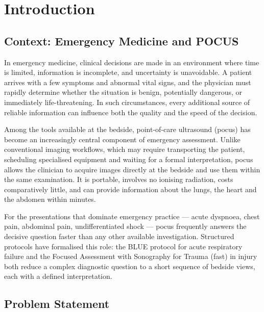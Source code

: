 \section{Introduction}
\label{sec:introduction}

\subsection{Context: Emergency Medicine and POCUS}
\label{subsec:context}

In emergency medicine, clinical decisions are made in an environment where time is
limited, information is incomplete, and uncertainty is unavoidable. A patient arrives with
a few symptoms and abnormal vital signs, and the physician must rapidly determine whether
the situation is benign, potentially dangerous, or immediately life-threatening. In such
circumstances, every additional source of reliable information can influence both the
quality and the speed of the decision.

Among the tools available at the bedside, point-of-care ultrasound (\gls{pocus}) has
become an increasingly central component of emergency assessment. Unlike conventional imaging workflows, which may
require transporting the patient, scheduling specialised equipment and waiting for a
formal interpretation, \gls{pocus} allows the clinician to acquire images directly at the
bedside and use them within the same examination. It is portable, involves no ionising
radiation, costs comparatively little, and can provide information about the lungs, the
heart and the abdomen within minutes.

For the presentations that dominate emergency practice --- acute dyspnoea, chest pain,
abdominal pain, undifferentiated shock --- \gls{pocus} frequently answers the decisive
question faster than any other available investigation. Structured protocols have
formalised this role: the BLUE protocol for acute respiratory failure
\cite{lichtenstein2008blue} and the Focused Assessment with Sonography for Trauma
(\gls{fast}) in injury both reduce a complex diagnostic question to a short sequence of
bedside views, each with a defined interpretation.

\subsection{Problem Statement}
\label{subsec:problem}


